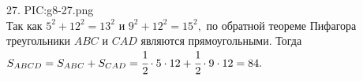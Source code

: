 27. {{PIC:g8-27.png}}\\
Так как $5^2+12^2=13^2$ и $9^2+12^2=15^2,$ по обратной теореме Пифагора треугольники $ABC$ и $CAD$ являются прямоугольными. Тогда $S_{ABCD}=S_{ABC}+S_{CAD}=\cfrac{1}{2}\cdot5\cdot12+\cfrac{1}{2}\cdot9\cdot12=84.$\\
